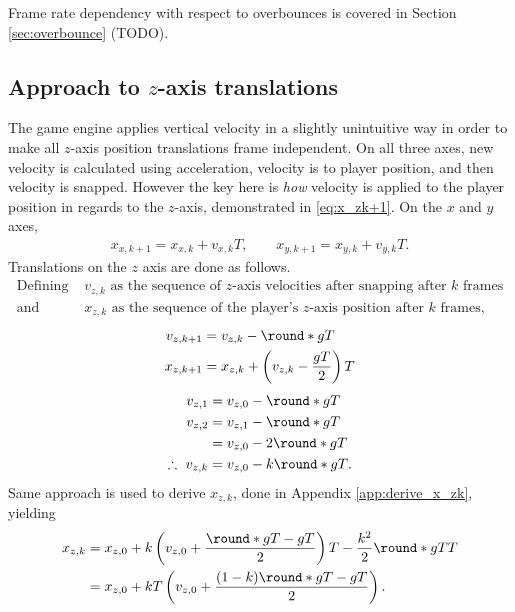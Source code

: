 Frame rate dependency with respect to overbounces is covered in Section \ref{sec:overbounce} (TODO).


\subsection{Approach to $z$-axis translations}
\label{sec:x_z}
The game engine applies vertical velocity in a slightly unintuitive way in order to make all $z$-axis position translations frame independent.
On all three axes, new velocity is calculated using acceleration, velocity is to player position, and then velocity is snapped.
However the key here is \emph{how} velocity is applied to the player position in regards to the $z$-axis, demonstrated in \eqref{eq:x_zk+1}.
On the $x$ and $y$ axes,
\begin{align*}
x_{x,k+1} = x_{x,k} + v_{x,k} T,\qquad x_{y,k+1} = x_{y,k} + v_{y,k} T.
\end{align*}
Translations on the $z$ axis are done as follows.
\begin{align*}
\text{Defining }&v_{z,k}\text{ as the sequence of $z$-axis velocities after snapping after $k$ frames}\\
\text{and }&x_{z,k}\text{ as the sequence of the player's $z$-axis position after $k$ frames},
\end{align*}
\begin{align}
\label{eq:v_zk+1}
v_{z,k+1} &= v_{z,k} - \round*{gT}\\
\label{eq:x_zk+1}
x_{z,k+1} &= x_{z,k} + \left(v_{z,k} - \frac{gT}{2} \right) T
\end{align}
\begin{align}
\nonumber
v_{z,1} &= v_{z,0} - \round*{gT}\\\nonumber
v_{z,2} &= v_{z,1} - \round*{gT}\\\nonumber
&= v_{z,0} - 2\round*{gT}\\
\label{eq:v_zk}
\therefore\ v_{z,k} &= v_{z,0} - k\round*{gT}.
\end{align}
Same approach is used to derive $x_{z,k}$, done in Appendix \ref{app:derive_x_zk}, yielding
\begin{align}
\label{eq:x_zk}
x_{z,k} &= x_{z,0} + k\left(v_{z,0} + \frac{\round*{gT} - gT}{2} \right) T - \frac{k^2}{2} \round*{gT} T\\\nonumber
&= x_{z,0} + kT\left(v_{z,0} + \frac{(1 - k)\round*{gT} - gT}{2} \right).
\end{align}

